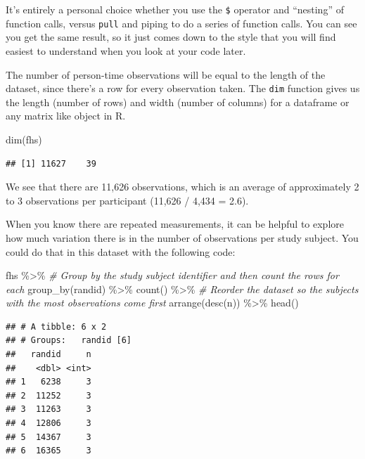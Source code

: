 \documentclass[
]{book}
\newenvironment{Shaded}{\begin{snugshade}}{\end{snugshade}}
\newcommand{\CommentTok}[1]{\textcolor[rgb]{0.56,0.35,0.01}{\textit{#1}}}
\newcommand{\FunctionTok}[1]{\textcolor[rgb]{0.00,0.00,0.00}{#1}}
\newcommand{\NormalTok}[1]{#1}
\newcommand{\SpecialCharTok}[1]{\textcolor[rgb]{0.00,0.00,0.00}{#1}}
\begin{document}
It's entirely a personal choice whether you use the \texttt{\$} operator and ``nesting''
of function calls, versus \texttt{pull} and piping to do a series of function calls.
You can see you get the same result, so it just comes down to the style that
you will find easiest to understand when you look at your code later.

The number of person-time observations will be equal to the length of the dataset, since there's a row for every observation taken.
The \texttt{dim} function gives us the length (number of rows) and width (number of columns) for a dataframe or any matrix like object in R.

\begin{Shaded}
\begin{Highlighting}[]
\FunctionTok{dim}\NormalTok{(fhs)}
\end{Highlighting}
\end{Shaded}

\begin{verbatim}
## [1] 11627    39
\end{verbatim}

We see that there are 11,626 observations, which is an average of approximately 2 to 3 observations per participant (11,626 / 4,434 = 2.6).

When you know there are repeated measurements, it can be helpful to explore
how much variation there is in the number of observations per study subject.
You could do that in this dataset with the following code:

\begin{Shaded}
\begin{Highlighting}[]
\NormalTok{fhs }\SpecialCharTok{\%\textgreater{}\%} 
  \CommentTok{\# Group by the study subject identifier and then count the rows for each}
  \FunctionTok{group\_by}\NormalTok{(randid) }\SpecialCharTok{\%\textgreater{}\%} 
  \FunctionTok{count}\NormalTok{() }\SpecialCharTok{\%\textgreater{}\%} 
  \CommentTok{\# Reorder the dataset so the subjects with the most observations come first}
  \FunctionTok{arrange}\NormalTok{(}\FunctionTok{desc}\NormalTok{(n)) }\SpecialCharTok{\%\textgreater{}\%} 
  \FunctionTok{head}\NormalTok{()}
\end{Highlighting}
\end{Shaded}

\begin{verbatim}
## # A tibble: 6 x 2
## # Groups:   randid [6]
##   randid     n
##    <dbl> <int>
## 1   6238     3
## 2  11252     3
## 3  11263     3
## 4  12806     3
## 5  14367     3
## 6  16365     3
\end{verbatim}
\end{document}
